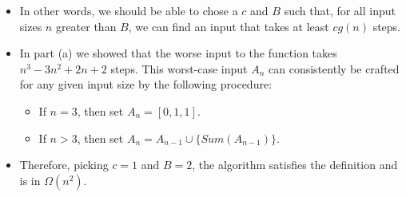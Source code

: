 \documentclass{article}
\begin{document}
\begin{enumerate}
\begin{enumerate}
\begin{itemize}
        \item In other words, we should be able to chose a $c$ and $B$ such that, for all input sizes $n$ greater than $B$, we can find an input that takes at least $cg(n)$ steps.
        \item In part (a) we showed that the worse input to the function takes $n^3 - 3n^2 + 2n + 2$ steps. This worst-case input $A_n$ can consistently be crafted for any given input size by the following procedure:
            \begin{itemize}
            \item If $n = 3$, then set $A_n = [0, 1, 1]$.
            \item If $n > 3$, then set $A_n = A_{n - 1} \cup \{ Sum(A_{n - 1}) \}$.
            \end{itemize}
        \item Therefore, picking $c = 1$ and $B = 2$, the algorithm satisfies the definition and is in $\Omega(n^2)$.
        \end{itemize}
    \end{enumerate}


\end{enumerate}
\end{document}

